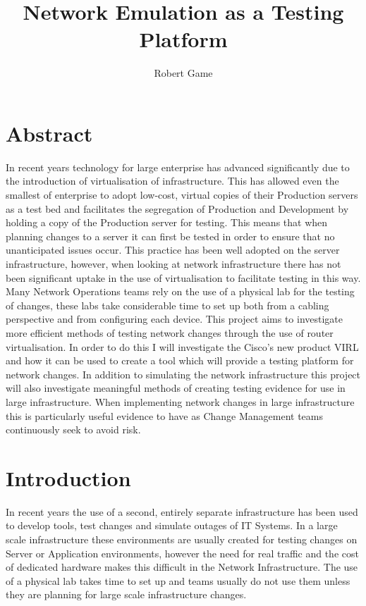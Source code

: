 \documentclass[11pt]{report}
\begin{document}
\title{Network Emulation as a Testing Platform}
\author{Robert Game}
\date{}
\maketitle

\chapter*{Abstract}

In recent years technology for large enterprise has advanced significantly due to the introduction of virtualisation of infrastructure. This has allowed even the smallest of enterprise to adopt low-cost, virtual copies of their Production servers as a test bed and facilitates the segregation of Production and Development by holding a copy of the Production server for testing. This means that when planning changes to a server it can first be tested in order to ensure that no unanticipated issues occur. This practice has been well adopted on the server infrastructure, however, when looking at network infrastructure there has not been significant uptake in the use of virtualisation to facilitate testing in this way. Many Network Operations teams rely on the use of a physical lab for the testing of changes, these labs take considerable time to set up both from a cabling perspective and from configuring each device. This project aims to investigate more efficient methods of testing network changes through the use of router virtualisation. In order to do this I will investigate the Cisco's new product VIRL and how it can be used to create a tool which will provide a testing platform for network changes. In addition to simulating the network infrastructure this project will also investigate meaningful methods of creating testing evidence for use in large infrastructure. When implementing network changes in large infrastructure this is particularly useful evidence to have as Change Management teams continuously seek to avoid risk.

\pagebreak

\tableofcontents

\chapter{Introduction}

In recent years the use of a second, entirely separate infrastructure has been used to develop tools, test changes and simulate outages of IT Systems. In a large scale infrastructure these environments are usually created for testing changes on Server or Application environments, however the need for real traffic and the cost of dedicated hardware makes this difficult in the Network Infrastructure. The use of a physical lab takes time to set up and teams usually do not use them unless they are planning for large scale infrastructure changes.
\end{document}
